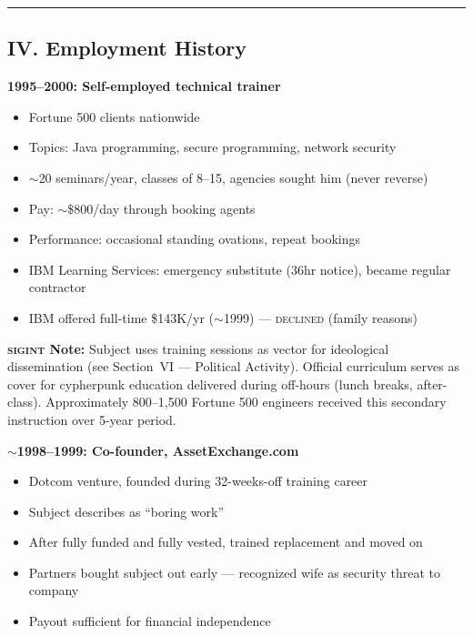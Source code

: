 \vspace{1cm}\hrule\vspace{1cm}

\subsection*{IV. Employment History}
\label{interlude:employment-history}

\textbf{1995--2000: Self-employed technical trainer}

\begin{itemize}[nosep]
\item Fortune 500 clients nationwide
\item Topics: Java programming, secure programming, network security
\item $\sim$20 seminars/year, classes of 8--15, agencies sought him (never reverse)
\item Pay: $\sim$\$800/day through booking agents
\item Performance: occasional standing ovations, repeat bookings
\item IBM Learning Services: emergency substitute (36hr notice), became regular contractor
\item IBM offered full-time \$143K/yr ($\sim$1999) --- \textsc{declined} (family reasons)
\end{itemize}

\textbf{\textsc{sigint} Note:} Subject uses training sessions as vector for ideological dissemination (see Section~VI --- Political Activity). Official curriculum serves as cover for cypherpunk education delivered during off-hours (lunch breaks, after-class). Approximately 800--1,500 Fortune 500 engineers received this secondary instruction over 5-year period.

\textbf{$\sim$1998--1999: Co-founder, AssetExchange.com}

\begin{itemize}[nosep]
\item Dotcom venture, founded during 32-weeks-off training career
\item Subject describes as ``boring work''
\item After fully funded and fully vested, trained replacement and moved on
\item Partners bought subject out early --- recognized wife as security threat to company
\item Payout sufficient for financial independence
\end{itemize}

